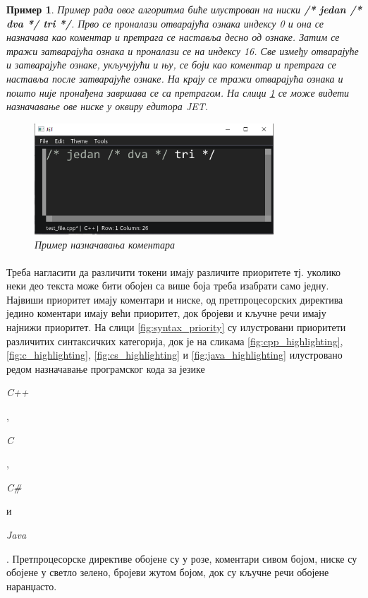 \documentclass[12pt,oneside]{memoir}
\newtheorem{exmp}{Пример}
\begin{document}
\begin{exmp}
Пример рада овог алгоритма биће илустрован на ниски 
\textbf{/* jedan /* dva */ tri */}. Прво се проналази
отварајућа ознака индексу 0 и она се назначава као коментар и претрага се наставља десно од ознаке. Затим се тражи затварајућа ознака и проналази се на индексу 16. Све између отварајуће и затварајуће ознаке, укључујући и њу, се боји као коментар и претрага се наставља после  затварајуће ознаке. На крају се тражи отварајућа ознака и пошто није пронађена завршава се са претрагом. На слици \ref{fig:comment_example} се може видети назначавање ове ниске
у оквиру едитора \textit{JET}.

\begin{figure}
	\centering
	\includegraphics[width=0.8\textwidth]{images/comment_example.png}
	\caption{Пример назначавања коментара}
	\label{fig:comment_example}
\end{figure}
\end{exmp}

\paragraph{}
Треба нагласити да различити токени имају различите приоритете тј.
уколико неки део текста може бити обојен са више боја треба изабрати
само једну. Највиши приоритет имају коментари и ниске,
од претпроцесорских директива једино коментари имају већи приоритет,
док бројеви и кључне речи имају најнижи приоритет. На слици \ref{fig:syntax_priority}
су илустровани приоритети различитих синтаксичких категорија, док је
на сликама \ref{fig:cpp_highlighting}, \ref{fig:c_highlighting},
\ref{fig:cs_highlighting} и \ref{fig:java_highlighting} илустровано редом назначавање програмског кода за језике \begin{latinica}\textit{C++}\end{latinica},
\begin{latinica}\textit{C}\end{latinica}, \begin{latinica}\textit{C\#}\end{latinica}
и \begin{latinica}\textit{Java}\end{latinica}.  Претпроцесорске директиве обојене су
у розе, коментари сивом бојом, ниске су обојене у светло зелено, бројеви жутом
бојом, док су кључне речи обојене наранџасто.
\end{document}
